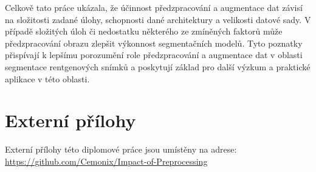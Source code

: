 \documentclass[male,czech,api_ing]{thesis}
\begin{document}
Celkově tato práce ukázala, že účinnost předzpracování a augmentace dat závisí na složitosti zadané úlohy, schopnosti dané architektury a velikosti datové sady. V případě složitých úloh či nedostatku některého ze zmíněných faktorů může předzpracování obrazu zlepšit výkonnost segmentačních modelů. Tyto poznatky přispívají k lepšímu porozumění role předzpracování a augmentace dat v oblasti segmentace rentgenových snímků a poskytují základ pro další výzkum a praktické aplikace v této oblasti.

\printbibliography[title=Seznam použitých zdrojů]

\listoffigures

\listoftables

\lstlistoflistings

\appendix

\chapter{Externí přílohy\label{sec:ep}}




Externí přílohy této diplomové práce jsou umístěny na adrese: \\
\url{https://github.com/Cemonix/Impact-of-Preprocessing}
\end{document}
